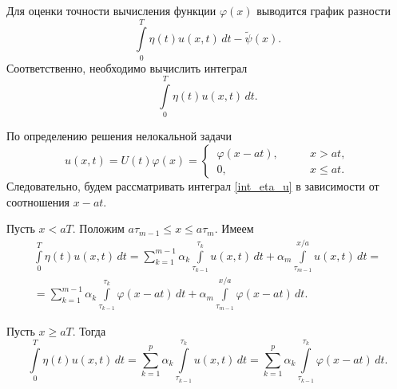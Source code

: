 \documentclass{article}
\renewcommand{\le}{\leqslant}
\renewcommand{\ge}{\geqslant}
\theoremstyle{definition}
\begin{document}
Для оценки точности вычисления функции $\varphi(x)$ выводится график разности
\begin{equation} \label{E}
	\int\limits_{0}^{T} \eta(t) u(x,t)\,dt - \widetilde{\psi}(x).
\end{equation}
Соответственно, необходимо вычислить интеграл
\begin{equation} \label{int_eta_u}
	\int\limits_{0}^{T} \eta(t) u(x,t)\,dt.
\end{equation}

По определению решения нелокальной задачи
\begin{equation*}
u(x,t) = U(t)\varphi(x) = 
	\begin{cases}
	\, \varphi(x - at), \qquad & x > at, \\
	\, 0, & x \le at.
	\end{cases}
\end{equation*}
Следовательно, будем рассматривать интеграл \eqref{int_eta_u} в зависимости от соотношения $x - at$.

Пусть $x < aT$. Положим $a\tau_{m - 1} \le x \le a\tau_m$. Имеем
\begin{gather*}
	\int\limits_{0}^{T} \eta(t) u(x,t)\,dt = \sum\limits_{k = 1}^{m - 1} \alpha_k \int\limits_{\tau_{k - 1}}^{\tau_k}u(x,t) \,dt +
	\alpha_m \int\limits_{\tau_{m - 1}}^{x/a}u(x,t) \,dt = \\[2mm]
	= \sum\limits_{k = 1}^{m - 1} \alpha_k \int\limits_{\tau_{k - 1}}^{\tau_k}\varphi(x - at) \,dt +
	\alpha_m \int\limits_{\tau_{m - 1}}^{x/a}\varphi(x - at) \,dt.
\end{gather*}

Пусть $x \ge aT$. Тогда
\begin{equation*}
	\int\limits_{0}^{T} \eta(t) u(x,t)\,dt = \sum\limits_{k = 1}^{p} \alpha_k \int\limits_{\tau_{k - 1}}^{\tau_k}u(x,t) \,dt =
	\sum\limits_{k = 1}^{p} \alpha_k \int\limits_{\tau_{k - 1}}^{\tau_k}\varphi(x - at) \,dt.
\end{equation*}
\end{document}
